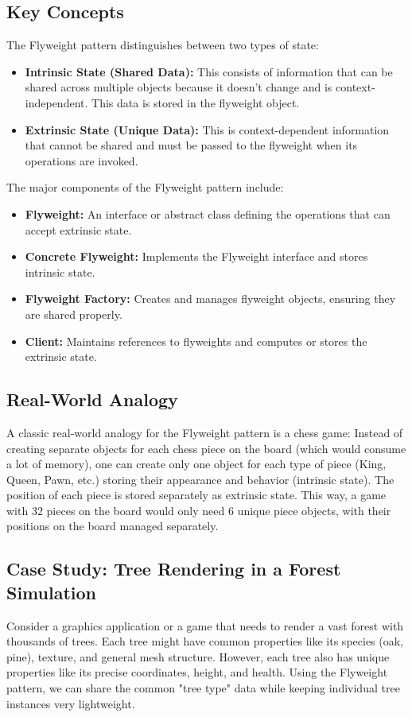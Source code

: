 \documentclass[12pt,a4paper]{article}
\begin{document}
\subsection{Key Concepts}
The Flyweight pattern distinguishes between two types of state:
\begin{itemize}
    \item \textbf{Intrinsic State (Shared Data):} This consists of information that can be shared across multiple objects because it doesn't change and is context-independent. This data is stored in the flyweight object.
    \item \textbf{Extrinsic State (Unique Data):} This is context-dependent information that cannot be shared and must be passed to the flyweight when its operations are invoked.
\end{itemize}
The major components of the Flyweight pattern include:
\begin{itemize}
    \item \textbf{Flyweight:} An interface or abstract class defining the operations that can accept extrinsic state.
    \item \textbf{Concrete Flyweight:} Implements the Flyweight interface and stores intrinsic state.
    \item \textbf{Flyweight Factory:} Creates and manages flyweight objects, ensuring they are shared properly.
    \item \textbf{Client:} Maintains references to flyweights and computes or stores the extrinsic state.
\end{itemize}

\subsection{Real-World Analogy}
A classic real-world analogy for the Flyweight pattern is a chess game: Instead of creating separate objects for each chess piece on the board (which would consume a lot of memory), one can create only one object for each type of piece (King, Queen, Pawn, etc.) storing their appearance and behavior (intrinsic state). The position of each piece is stored separately as extrinsic state. This way, a game with 32 pieces on the board would only need 6 unique piece objects, with their positions on the board managed separately.

\subsection{Case Study: Tree Rendering in a Forest Simulation}
Consider a graphics application or a game that needs to render a vast forest with thousands of trees. Each tree might have common properties like its species (oak, pine), texture, and general mesh structure. However, each tree also has unique properties like its precise coordinates, height, and health. Using the Flyweight pattern, we can share the common "tree type" data while keeping individual tree instances very lightweight.
\end{document}
